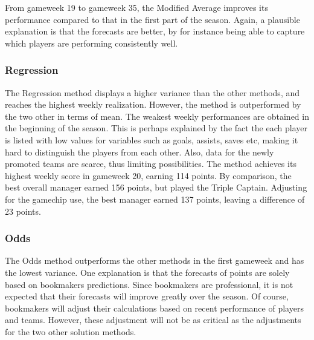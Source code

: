 \newpar

From gameweek 19 to gameweek 35, the Modified Average improves its performance compared to that in the first part of the season. Again, a plausible explanation is that the forecasts are better, by for instance being able to capture which players are performing consistently well.


\subsubsection{Regression}

The Regression method displays a higher variance than the other methods, and reaches the highest weekly realization. However, the method is outperformed by the two other in terms of mean. The weakest weekly performances are obtained in the beginning of the season. This is perhaps explained by the fact the each player is listed with low values for variables such as goals, assists,  saves etc, making it hard to distinguish the players from each other. Also, data for the newly promoted teams are scarce, thus limiting possibilities. The method achieves its highest weekly score in gameweek 20, earning 114 points. By comparison, the best overall manager earned 156 points, but played the Triple Captain. Adjusting for the gamechip use, the best manager earned 137 points, leaving a difference of 23 points.

\subsubsection{Odds}

\newpar

The Odds method outperforms the other methods in the first gameweek and has the lowest variance. One explanation is that the forecasts of points are solely based on bookmakers predictions. Since bookmakers are professional, it is not expected that their forecasts will improve greatly over the season. Of course, bookmakers will adjust their calculations based on recent performance of players and teams. However, these adjustment will not be as critical as the adjustments for the two other solution methods. 

